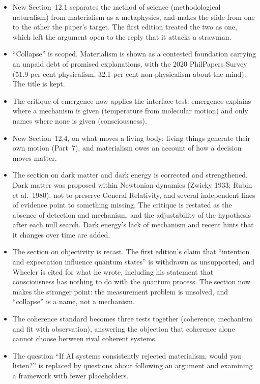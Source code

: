 \documentclass[11pt,a4paper]{article}
\begin{document}
\begin{itemize}
  \item New Section~12.1 separates the method of science (methodological naturalism) from materialism as a metaphysics, and makes the slide from one to the other the paper's target. The first edition treated the two as one, which left the argument open to the reply that it attacks a strawman.
  \item ``Collapse'' is scoped. Materialism is shown as a contested foundation carrying an unpaid debt of promised explanations, with the 2020 PhilPapers Survey (51.9 per cent physicalism, 32.1 per cent non-physicalism about the mind). The title is kept.
  \item The critique of emergence now applies the interface test: emergence explains where a mechanism is given (temperature from molecular motion) and only names where none is given (consciousness).
  \item New Section~12.4, on what moves a living body: living things generate their own motion (Part~7), and materialism owes an account of how a decision moves matter.
  \item The section on dark matter and dark energy is corrected and strengthened. Dark matter was proposed within Newtonian dynamics (Zwicky 1933; Rubin et al.\ 1980), not to preserve General Relativity, and several independent lines of evidence point to something missing. The critique is restated as the absence of detection and mechanism, and the adjustability of the hypothesis after each null search. Dark energy's lack of mechanism and recent hints that it changes over time are added.
  \item The section on objectivity is recast. The first edition's claim that ``intention and expectation influence quantum states'' is withdrawn as unsupported, and Wheeler is cited for what he wrote, including his statement that consciousness has nothing to do with the quantum process. The section now makes the stronger point: the measurement problem is unsolved, and ``collapse'' is a name, not a mechanism.
  \item The coherence standard becomes three tests together (coherence, mechanism and fit with observation), answering the objection that coherence alone cannot choose between rival coherent systems.
  \item The question ``If AI systems consistently rejected materialism, would you listen?'' is replaced by questions about following an argument and examining a framework with fewer placeholders.
\end{itemize}
\end{document}

